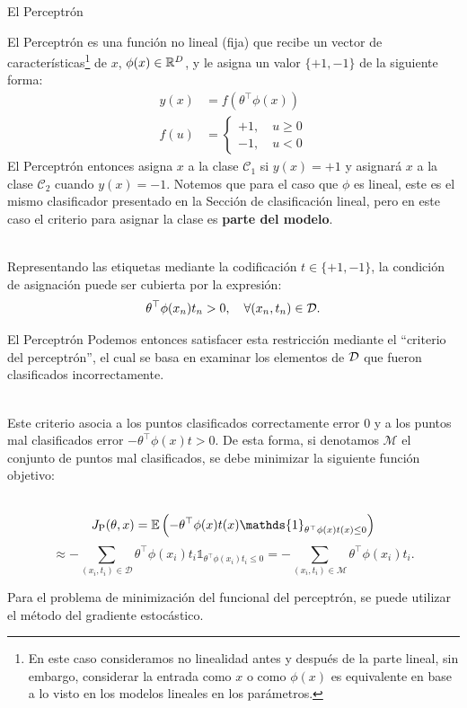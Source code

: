 \documentclass[handout, 9pt]{beamer}
\begin{document}
\begin{frame}{El Perceptrón}

El Perceptrón es una función no lineal (fija) que recibe un vector de características\footnote{En este caso consideramos no linealidad antes y después de la parte lineal, sin embargo, considerar la entrada como $x$ o  como $\phi(x)$ es  equivalente en base a lo  visto en los modelos lineales en los parámetros. } de $x$, $\phi(x)\in\mathbb{R}^D$, y le asigna un valor $\{+1,-1\}$ de la siguiente forma:
\begin{align*}
  y(x) &= f(\theta^\top\phi(x))\\
  f(u) &= \left\{\begin{matrix}
  +1,\quad u\geq 0\\
  -1,\quad u<0
  \end{matrix}\right.
\end{align*} \pause
El Perceptrón entonces asigna $x$ a la clase $\mathcal{C}_1$ si $y(x)=+1$ y asignará $x$ a la clase $\mathcal{C}_2$ cuando $y(x)=-1$. Notemos que  para  el caso que $\phi$ es lineal, este es el mismo clasificador presentado en la Sección de clasificación lineal, pero en este caso el criterio para asignar la clase es \textbf{parte del modelo}. \\~\

Representando las etiquetas mediante la codificación $t\in\{+1,-1\}$, la condición de asignación puede ser cubierta por la expresión:
\begin{equation*}
  \theta^\top\phi(x_n)t_n > 0,\quad \forall (x_n,t_n) \in {\mathcal D}.
\end{equation*}

\end{frame}

\begin{frame}{El Perceptrón}
Podemos entonces satisfacer esta restricción mediante el ``criterio del perceptrón'', el cual se basa en examinar  los elementos de ${\mathcal D}$ que fueron clasificados incorrectamente.\\~\ 

 Este criterio asocia a los puntos clasificados correctamente error 0 y a los puntos mal clasificados error $-\theta^\top\phi(x)t>0$. De esta forma, si denotamos $\mathcal{M}$ el conjunto de puntos mal clasificados, se debe minimizar la siguiente función objetivo: \\~\ 

\begin{equation*}
  J_\text{P}(\theta,x) = \E\left(-\theta^\top\phi(x)t(x)\mathds{1}_{\theta^\top\phi(x)t(x)\leq 0} \right) 
\end{equation*} \pause
\begin{equation*}
\approx -\sum_{(x_i,t_i)\in \mathcal{D}}\theta^\top\phi(x_i)t_i \mathds{1}_{\theta^\top\phi(x_i)t_i\leq 0} = -\sum_{(x_i,t_i)\in \mathcal{M}}\theta^\top\phi(x_i)t_i.
\end{equation*} 

Para el problema de minimización del funcional del perceptrón, se puede utilizar el método del gradiente estocástico.

\end{frame}
\end{document}
